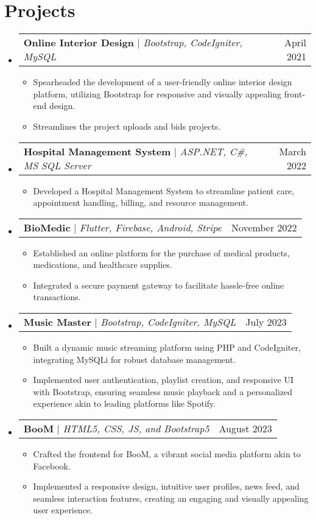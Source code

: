 \documentclass[letterpaper,11pt]{article}
\makeatletter
\newcommand{\resumeItem}[1]{
  \item\small{
    {#1 \vspace{-4pt}}
  }
}
\newcommand{\resumeProjectHeading}[2]{
 \vspace{-1pt}
    \item
    \begin{tabular*}{0.97\textwidth}{l@{\extracolsep{\fill}}r}
      \small#1 & #2 \\
    \end{tabular*}\vspace{-7pt}
}
\newcommand{\resumeSubHeadingListStart}{\begin{itemize}[leftmargin=0.05in, label={}]}
\newcommand{\resumeSubHeadingListEnd}{\end{itemize}}
\newcommand{\resumeItemListStart}{\begin{itemize}\vspace{2pt}}
\newcommand{\resumeItemListEnd}{\end{itemize}\vspace{-5pt}}
\makeatother
\begin{document}
\section{Projects}
    \resumeSubHeadingListStart
      \resumeProjectHeading
          {\textbf{Online Interior Design} $|$ \emph{Bootstrap, CodeIgniter, MySQL}}{April 2021}
          \resumeItemListStart
            \resumeItem{Spearheaded the development of a user-friendly online interior design platform, utilizing Bootstrap for responsive and visually appealing front-end design.}
            \resumeItem{Streamlines the project uploads and bids projects.}
          \resumeItemListEnd
          \resumeProjectHeading
          {\textbf{Hospital Management System} $|$ \emph{ASP.NET, C\#, MS SQL Server}}{March 2022}
          \resumeItemListStart
            \resumeItem{Developed a Hospital Management System to streamline patient care, appointment handling, billing, and resource management.}
          \resumeItemListEnd
        \resumeProjectHeading
          {\textbf{BioMedic} $|$ \emph{Flutter, Firebase, Android, Stripe}}{November 2022}
          \resumeItemListStart
            \resumeItem{Established an online platform for the purchase of medical products, medications, and healthcare supplies.}
            \resumeItem{Integrated a secure payment gateway to facilitate hassle-free online transactions.}
          \resumeItemListEnd
        \resumeProjectHeading
          {\textbf{Music Master} $|$ \emph{Bootstrap, CodeIgniter, MySQL}}{July 2023}
          \resumeItemListStart
            \resumeItem{Built a dynamic music streaming platform using PHP and CodeIgniter, integrating MySQLi for robust database management.}
            \resumeItem{ Implemented user authentication, playlist creation, and responsive UI with Bootstrap, ensuring seamless music playback and a personalized experience akin to leading platforms like Spotify.}
          \resumeItemListEnd
        \resumeProjectHeading
          {\textbf{BooM} $|$ \emph{HTML5, CSS, JS, and Bootstrap5}}{August 2023}
          \resumeItemListStart
            \resumeItem{Crafted the frontend for BooM, a vibrant social media platform akin to Facebook. }
            \resumeItem{Implemented a responsive design, intuitive user profiles,  news feed, and seamless interaction features, creating an engaging and visually appealing user experience.}
        
          \resumeItemListEnd
    \resumeSubHeadingListEnd



%
\end{document}
